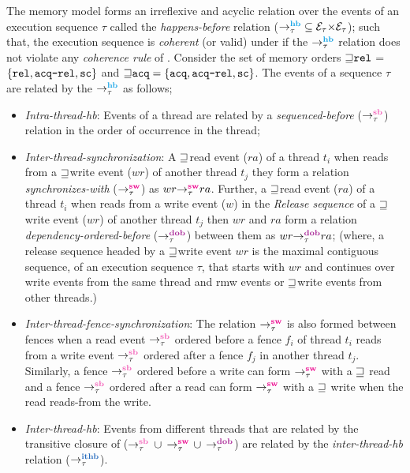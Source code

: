 The \cc memory model forms an irreflexive and acyclic relation over the events of 
an execution sequence $\tau$ called the {\em happens-before} relation 
($\setHB \subseteq \events_\tau {\times} \events_\tau$);
such that, the execution sequence is {\em coherent} (or valid) under \cc if 
the $\setHB$ relation does not violate any {\em coherence rule} of \cc
\cite{C11}\cite{batty2011mathematizing}.
%
Consider the set of memory orders ${\sqsupseteq} \texttt{rel}$ = $\{\texttt{rel}, \texttt{acq-rel}, \texttt{sc}\}$
and ${\sqsupseteq} \texttt{acq} = \{\texttt{acq}, \texttt{acq-rel}, \texttt{sc}\}$.
%
The events of a sequence $\tau$ are related by the $\setHB$ as follows;
\begin{itemize}
	\item {\em Intra-thread-hb}: Events of a thread are related by a {\em sequenced-before}
	($\setSB$) relation in the order of occurrence in the thread;
	
	\item {\em Inter-thread-synchronization}: A ${\sqsupseteq}$\acq read event ($ra$) of a thread 
	$t_i$ when reads from a ${\sqsupseteq}$\rel write event ($wr$) of another thread $t_j$ they form a
	relation {\em synchronizes-with} ($\setSW$) as $\sw{\tau}{wr}{ra}$.
	Further, a ${\sqsupseteq}$\acq read event ($ra$) of a thread $t_i$ when reads from a write 
	event ($w$) in the {\em Release sequence} \cite{C11} of a ${\sqsupseteq}$\rel write event ($wr$) of 
	another thread $t_j$ then $wr$ and $ra$ form a relation {\em dependency-ordered-before}
	($\setDOB$) between them as $\dob{\tau}{wr}{ra}$;
	(where, a release sequence headed by a ${\sqsupseteq}$\rel write event $wr$ is the maximal 
	contiguous sequence, of an execution sequence $\tau$, that starts with $wr$ and continues 
	over write events from the same thread and rmw events or ${\sqsupseteq}$\rel write events from
	other threads.)
	
	\item {\em Inter-thread-fence-synchronization}: The relation $\setSW$ is also formed 
	between \cc fences when a read event $\setSB$ ordered before a fence $f_i$ of thread 
	$t_i$ reads from a write event $\setSB$ ordered after a fence $f_j$ in another thread
	$t_j$.
	Similarly, a fence $\setSB$ ordered before a write can form $\setSW$ with a ${\sqsupseteq}$\acq
	read and a fence $\setSB$ ordered after a read can form $\setSW$ with a ${\sqsupseteq}$\rel
	write when the read reads-from the write.
	
	\item {\em Inter-thread-hb}: Events from different threads that are related by the 
	transitive closure of ($\setSB$ $\cup$ $\setSW$ $\cup$ $\setDOB$) are related by 
	the {\em inter-thread-hb} relation ($\setITHB$). 
\end{itemize}

